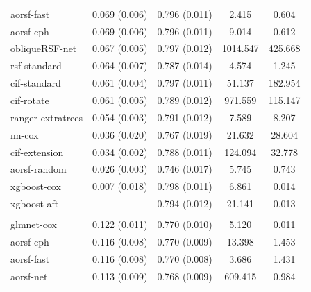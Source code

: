 \documentclass[twoside,11pt]{article}\usepackage[]{graphicx}\usepackage[]{xcolor}
\newenvironment{knitrout}{}{} %
\begin{document}
\begin{knitrout}
\begin{longtable}[t]{lcccc}
\hspace{1em}aorsf-fast & 0.069 (0.006) & 0.796 (0.011) & 2.415 & 0.604\\
\hspace{1em}aorsf-cph & 0.069 (0.006) & 0.796 (0.011) & 9.014 & 0.612\\
\hspace{1em}obliqueRSF-net & 0.067 (0.005) & 0.797 (0.012) & 1014.547 & 425.668\\
\hspace{1em}rsf-standard & 0.064 (0.007) & 0.787 (0.014) & 4.574 & 1.245\\
\hspace{1em}cif-standard & 0.061 (0.004) & 0.797 (0.011) & 51.137 & 182.954\\
\hspace{1em}cif-rotate & 0.061 (0.005) & 0.789 (0.012) & 971.559 & 115.147\\
\hspace{1em}ranger-extratrees & 0.054 (0.003) & 0.791 (0.012) & 7.589 & 8.207\\
\hspace{1em}nn-cox & 0.036 (0.020) & 0.767 (0.019) & 21.632 & 28.604\\
\hspace{1em}cif-extension & 0.034 (0.002) & 0.788 (0.011) & 124.094 & 32.778\\
\hspace{1em}aorsf-random & 0.026 (0.003) & 0.746 (0.017) & 5.745 & 0.743\\
\hspace{1em}xgboost-cox & 0.007 (0.018) & 0.798 (0.011) & 6.861 & 0.014\\
\hspace{1em}xgboost-aft & --- & 0.794 (0.012) & 21.141 & 0.013\\
\addlinespace[0.3em]
\multicolumn{5}{l}{\textit{\textbf{SPRINT; death, n = 9361, p = 174}}}\\
\hline
\hspace{1em}glmnet-cox & 0.122 (0.011) & 0.770 (0.010) & 5.120 & 0.011\\
\hspace{1em}aorsf-cph & 0.116 (0.008) & 0.770 (0.009) & 13.398 & 1.453\\
\hspace{1em}aorsf-fast & 0.116 (0.008) & 0.770 (0.008) & 3.686 & 1.431\\
\hspace{1em}aorsf-net & 0.113 (0.009) & 0.768 (0.009) & 609.415 & 0.984\\

\end{longtable}
\end{knitrout}
\end{document}
